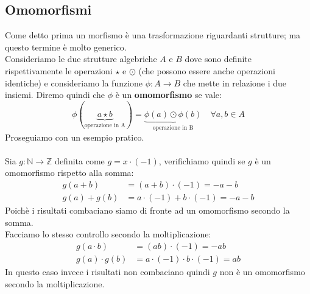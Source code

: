 \subsection{Omomorfismi}
Come detto prima un morfismo è una trasformazione riguardanti strutture;
ma questo termine è molto generico. \\
Consideriamo le due strutture algebriche \(A\) e \(B\) dove sono
definite rispettivamente le operazioni \(\star\) e \(\odot\)
(che possono essere anche operazioni identiche)
e consideriamo la funzione \(\phi : A \to B\) che mette in relazione i due insiemi.
Diremo quindi che \(\phi\) è un \textbf{omomorfismo} se vale:
\[ 
  \phi( \underbrace{a \star b}_{\text{operazione in A}} ) 
  = 
  \underbrace{\phi(a) \odot \phi(b)}_{\text{operazione in B}}
  \quad \forall a,b \in A
\]
Proseguiamo con un esempio pratico.
\\
\\
Sia \(g: \mathbb{N} \to \mathbb{Z}\) definita come \(g = x \cdot (-1)\), verifichiamo
quindi se \(g\) è un omomorfismo rispetto alla somma: 
\begin{align*}
  g(a + b) &= (a + b) \cdot (-1) = -a -b \\
  g(a) + g(b) &= a \cdot (-1) + b \cdot (-1) = -a -b 
\end{align*}
Poichè i risultati combaciano siamo di fronte ad un omomorfismo secondo la somma. \\
Facciamo lo stesso controllo secondo la moltiplicazione:
\begin{align*}
  g(a \cdot b) &= (ab) \cdot (-1) = -ab \\
  g(a) \cdot g(b) &= a \cdot (-1) \cdot b \cdot (-1) = ab 
\end{align*}
In questo caso invece i risultati non combaciano quindi \(g\) non è un 
omomorfismo secondo la moltiplicazione.

